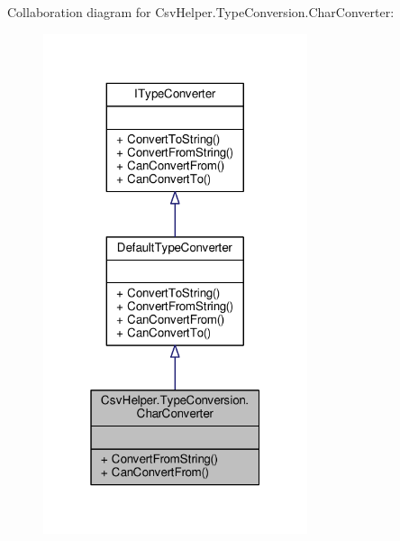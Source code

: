 Collaboration diagram for Csv\-Helper.\-Type\-Conversion.\-Char\-Converter\-:
\nopagebreak
\begin{figure}[H]
\begin{center}
\leavevmode
\includegraphics[width=220pt]{a00519}
\end{center}
\end{figure}
